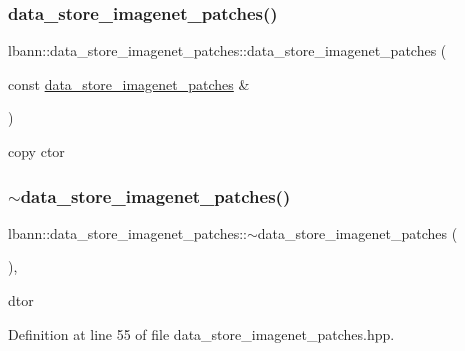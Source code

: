 \subsubsection{\texorpdfstring{data\+\_\+store\+\_\+imagenet\+\_\+patches()}{data\_store\_imagenet\_patches()}\hspace{0.1cm}{\footnotesize\ttfamily [2/2]}}
{\footnotesize\ttfamily lbann\+::data\+\_\+store\+\_\+imagenet\+\_\+patches\+::data\+\_\+store\+\_\+imagenet\+\_\+patches (\begin{DoxyParamCaption}\item[{const \hyperlink{classlbann_1_1data__store__imagenet__patches}{data\+\_\+store\+\_\+imagenet\+\_\+patches} \&}]{ }\end{DoxyParamCaption})\hspace{0.3cm}{\ttfamily [default]}}



copy ctor 

\mbox{\label{classlbann_1_1data__store__imagenet__patches_ac4b8e5f893a4eccdeceee9c872a4b5b9}} 
\subsubsection{\texorpdfstring{$\sim$data\+\_\+store\+\_\+imagenet\+\_\+patches()}{~data\_store\_imagenet\_patches()}}
{\footnotesize\ttfamily lbann\+::data\+\_\+store\+\_\+imagenet\+\_\+patches\+::$\sim$data\+\_\+store\+\_\+imagenet\+\_\+patches (\begin{DoxyParamCaption}{ }\end{DoxyParamCaption})\hspace{0.3cm}{\ttfamily [inline]}, {\ttfamily [override]}}



dtor 



Definition at line 55 of file data\+\_\+store\+\_\+imagenet\+\_\+patches.\+hpp.


